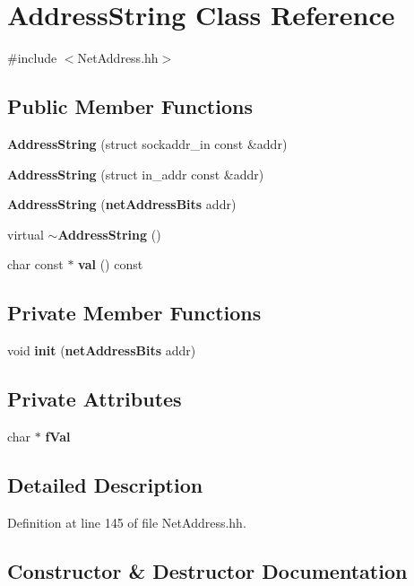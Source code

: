 \section{Address\+String Class Reference}
\label{classAddressString}


{\ttfamily \#include $<$Net\+Address.\+hh$>$}

\subsection*{Public Member Functions}
\begin{DoxyCompactItemize}
\item 
{\bf Address\+String} (struct sockaddr\+\_\+in const \&addr)
\item 
{\bf Address\+String} (struct in\+\_\+addr const \&addr)
\item 
{\bf Address\+String} ({\bf net\+Address\+Bits} addr)
\item 
virtual {\bf $\sim$\+Address\+String} ()
\item 
char const $\ast$ {\bf val} () const 
\end{DoxyCompactItemize}
\subsection*{Private Member Functions}
\begin{DoxyCompactItemize}
\item 
void {\bf init} ({\bf net\+Address\+Bits} addr)
\end{DoxyCompactItemize}
\subsection*{Private Attributes}
\begin{DoxyCompactItemize}
\item 
char $\ast$ {\bf f\+Val}
\end{DoxyCompactItemize}


\subsection{Detailed Description}


Definition at line 145 of file Net\+Address.\+hh.



\subsection{Constructor \& Destructor Documentation}
